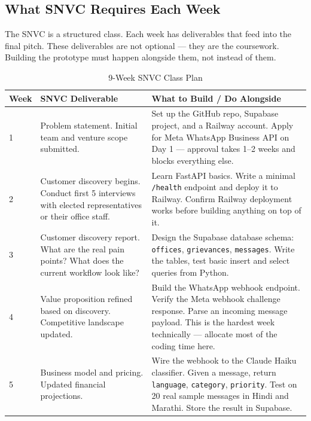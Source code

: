 \documentclass[12pt, a4paper]{article}
\begin{document}
\subsection{What SNVC Requires Each Week}

The SNVC is a structured class. Each week has deliverables that feed into
the final pitch. These deliverables are not optional --- they are the coursework.
Building the prototype must happen alongside them, not instead of them.

\begin{table}[ht]
\centering
\caption{9-Week SNVC Class Plan}
\renewcommand{\arraystretch}{1.8}
\begin{tabularx}{\textwidth}{p{1.3cm} p{3.5cm} X}
\toprule
\rowcolor{pollitylightblue}
\textbf{Week} & \textbf{SNVC Deliverable} & \textbf{What to Build / Do Alongside} \\
\midrule
\rowcolor{lightpurple!40}
1 & Problem statement. Initial team and venture scope submitted. & Set up the GitHub repo, Supabase project, and a Railway account. Apply for Meta WhatsApp Business API on Day 1 --- approval takes 1--2 weeks and blocks everything else. \\
\midrule
\rowcolor{lightpurple!40}
2 & Customer discovery begins. Conduct first 5 interviews with elected representatives or their office staff. & Learn FastAPI basics. Write a minimal \texttt{/health} endpoint and deploy it to Railway. Confirm Railway deployment works before building anything on top of it. \\
\midrule
\rowcolor{lightpurple!40}
3 & Customer discovery report. What are the real pain points? What does the current workflow look like? & Design the Supabase database schema: \texttt{offices}, \texttt{grievances}, \texttt{messages}. Write the tables, test basic insert and select queries from Python. \\
\midrule
\rowcolor{lightpurple!40}
4 & Value proposition refined based on discovery. Competitive landscape updated. & Build the WhatsApp webhook endpoint. Verify the Meta webhook challenge response. Parse an incoming message payload. This is the hardest week technically --- allocate most of the coding time here. \\
\midrule
\rowcolor{lightpurple!40}
5 & Business model and pricing. Updated financial projections. & Wire the webhook to the Claude Haiku classifier. Given a message, return \texttt{language}, \texttt{category}, \texttt{priority}. Test on 20 real sample messages in Hindi and Marathi. Store the result in Supabase. \\

\end{tabularx}
\end{table}
\end{document}
